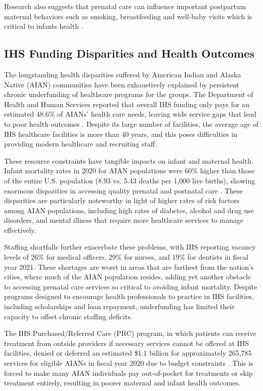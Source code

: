 \documentclass[12pt]{article}
\begin{document}
Research also suggests that prenatal care can influence important
postpartum maternal behaviors such as smoking, breastfeeding and
well-baby visits which is critical to infants health \citep{reichman2010}.
\subsection{IHS Funding Disparities and Health Outcomes}
The longstanding health disparities suffered by American Indian and Alaska Native (AIAN) communities have been exhaustively explained by persistent chronic underfunding of healthcare programs for the groups. The Department of Health and Human Services reported that overall IHS funding only pays for an estimated 48.6\% of AIANs' health care needs, leaving wide service gaps that lead to poor health outcomes \citep{aspe2022}. Despite its large number of facilities, the average age of IHS healthcare facilities is more than 40 years, and this poses difficulties in providing modern healthcare and recruiting staff.\newline

These resource constraints have tangible impacts on infant and maternal health. Infant mortality rates in 2020 for AIAN populations were 60\% higher than those of the entire U.S. population (8.93 vs. 5.43 deaths per 1,000 live births), showing enormous disparities in accessing quality prenatal and postnatal care \citep{aspe2022}. These disparities are particularly noteworthy in light of higher rates of risk factors among AIAN populations, including high rates of diabetes, alcohol and drug use disorders, and mental illness that require more healthcare services to manage effectively.

Staffing shortfalls further exacerbate these problems, with IHS reporting vacancy levels of 26\% for medical officers, 29\% for nurses, and 19\% for dentists in fiscal year 2021. These shortages are worst in areas that are farthest from the nation's cities, where much of the AIAN population resides, adding yet another obstacle to accessing prenatal care services so critical to avoiding infant mortality. Despite programs designed to encourage health professionals to practice in IHS facilities, including scholarships and loan repayment, underfunding has limited their capacity to offset chronic staffing deficits.

The IHS Purchased/Referred Care (PRC) program, in which patients can receive treatment from outside providers if necessary services cannot be offered at IHS facilities, denied or deferred an estimated \$1.1 billion for approximately 265,785 services for eligible AIANs in fiscal year 2020 due to budget constraints \citep{aspe2022}. This is forced to make many AIAN individuals pay out-of-pocket for treatments or skip treatment entirely, resulting in poorer maternal and infant health outcomes.
\end{document}
